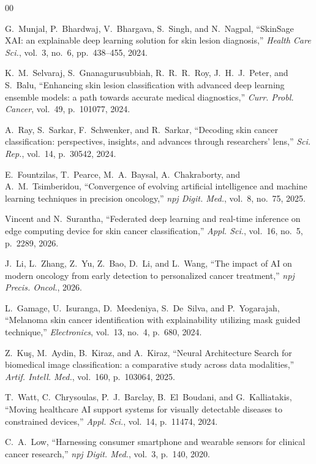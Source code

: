 \documentclass[conference]{IEEEtran}
\begin{document}
\begin{thebibliography}{00}
 
 G.~Munjal, P.~Bhardwaj, V.~Bhargava, S.~Singh, and N.~Nagpal, ``SkinSage XAI: an explainable deep learning solution for skin lesion diagnosis,'' \textit{Health Care Sci.}, vol.~3, no.~6, pp.~438--455, 2024.
 
 K.~M.~Selvaraj, S.~Gnanagurusubbiah, R.~R.~R.~Roy, J.~H.~J.~Peter, and S.~Balu, ``Enhancing skin lesion classification with advanced deep learning ensemble models: a path towards accurate medical diagnostics,'' \textit{Curr. Probl. Cancer}, vol.~49, p.~101077, 2024.
 
 A.~Ray, S.~Sarkar, F.~Schwenker, and R.~Sarkar, ``Decoding skin cancer classification: perspectives, insights, and advances through researchers' lens,'' \textit{Sci. Rep.}, vol.~14, p.~30542, 2024.
 
 E.~Fountzilas, T.~Pearce, M.~A.~Baysal, A.~Chakraborty, and A.~M.~Tsimberidou, ``Convergence of evolving artificial intelligence and machine learning techniques in precision oncology,'' \textit{npj Digit. Med.}, vol.~8, no.~75, 2025.
 
 Vincent and N.~Surantha, ``Federated deep learning and real-time inference on edge computing device for skin cancer classification,'' \textit{Appl. Sci.}, vol.~16, no.~5, p.~2289, 2026.
 
 J.~Li, L.~Zhang, Z.~Yu, Z.~Bao, D.~Li, and L.~Wang, ``The impact of AI on modern oncology from early detection to personalized cancer treatment,'' \textit{npj Precis. Oncol.}, 2026.
 
 L.~Gamage, U.~Isuranga, D.~Meedeniya, S.~De~Silva, and P.~Yogarajah, ``Melanoma skin cancer identification with explainability utilizing mask guided technique,'' \textit{Electronics}, vol.~13, no.~4, p.~680, 2024.
 
 Z.~Ku\c{s}, M.~Aydin, B.~Kiraz, and A.~Kiraz, ``Neural Architecture Search for biomedical image classification: a comparative study across data modalities,'' \textit{Artif. Intell. Med.}, vol.~160, p.~103064, 2025.
 
 T.~Watt, C.~Chrysoulas, P.~J.~Barclay, B.~El~Boudani, and G.~Kalliatakis, ``Moving healthcare AI support systems for visually detectable diseases to constrained devices,'' \textit{Appl. Sci.}, vol.~14, p.~11474, 2024.
 
 C.~A.~Low, ``Harnessing consumer smartphone and wearable sensors for clinical cancer research,'' \textit{npj Digit. Med.}, vol.~3, p.~140, 2020.
 

\end{thebibliography}
\end{document}
